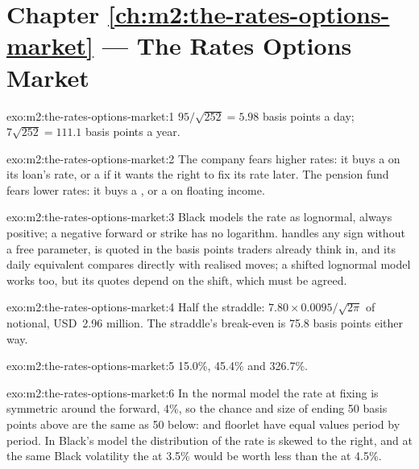 \section*{Chapter \ref{ch:m2:the-rates-options-market} --- The Rates Options Market}

\begin{solution}{exo:m2:the-rates-options-market:1}
$95/\sqrt{252} = 5.98$ basis points a day; $7\sqrt{252} = 111.1$ basis points a
year.
\end{solution}

\begin{solution}{exo:m2:the-rates-options-market:2}
The company fears higher rates: it buys a  on its loan's rate, or a  if it wants the right to fix its rate later. The pension fund fears
lower rates: it buys a , or a  on floating income.
\end{solution}

\begin{solution}{exo:m2:the-rates-options-market:3}
Black models the rate as lognormal, always positive; a negative forward or
strike has no logarithm.  handles any sign without a free
parameter, is quoted in the basis points traders already think in, and its
daily equivalent compares directly with realised moves; a shifted lognormal
model works too, but its quotes depend on the shift, which must be agreed.
\end{solution}

\begin{solution}{exo:m2:the-rates-options-market:4}
Half the straddle: $7.80 \times 0.0095/\sqrt{2\pi}$ of notional, USD~2.96
million. The straddle's break-even is 75.8 basis points either way.
\end{solution}

\begin{solution}{exo:m2:the-rates-options-market:5}
15.0\%, 45.4\% and 326.7\%.
\end{solution}

\begin{solution}{exo:m2:the-rates-options-market:6}
In the normal model the rate at fixing is symmetric around the forward, 4\%,
so the chance and size of ending 50 basis points above are the same as 50 below:
 and floorlet have equal values period by period. In Black's model the
distribution of the rate is skewed to the right, and at the same Black
volatility the  at 3.5\% would be worth less than the  at 4.5\%.
\end{solution}

